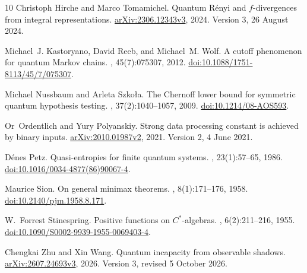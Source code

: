 \documentclass[11pt]{article}
\numberwithin{equation}{section}
\theoremstyle{definition}
\theoremstyle{remark}
\begin{document}
{\begin{thebibliography}{10}
Christoph Hirche and Marco Tomamichel.
\newblock Quantum {R\'enyi} and $f$-divergences from integral representations.
\newblock \href{https://arxiv.org/abs/2306.12343v3}{arXiv:2306.12343v3}, 2024.
\newblock Version 3, 26 August 2024.

Michael~J. Kastoryano, David Reeb, and Michael~M. Wolf.
\newblock A cutoff phenomenon for quantum {Markov} chains.
,
  45(7):075307, 2012.
\newblock
  \href{https://doi.org/10.1088/1751-8113/45/7/075307}{doi:10.1088/1751-8113/45/7/075307}.

Michael Nussbaum and Arleta Szko{\l}a.
\newblock The {Chernoff} lower bound for symmetric quantum hypothesis testing.
, 37(2):1040--1057, 2009.
\newblock \href{https://doi.org/10.1214/08-AOS593}{doi:10.1214/08-AOS593}.

Or~Ordentlich and Yury Polyanskiy.
\newblock Strong data processing constant is achieved by binary inputs.
\newblock \href{https://arxiv.org/abs/2010.01987v2}{arXiv:2010.01987v2}, 2021.
\newblock Version 2, 4 June 2021.

D{\'e}nes Petz.
\newblock Quasi-entropies for finite quantum systems.
, 23(1):57--65, 1986.
\newblock
  \href{https://doi.org/10.1016/0034-4877(86)90067-4}{doi:10.1016/0034-4877(86)90067-4}.

Maurice Sion.
\newblock On general minimax theorems.
, 8(1):171--176, 1958.
\newblock
  \href{https://doi.org/10.2140/pjm.1958.8.171}{doi:10.2140/pjm.1958.8.171}.

W.~Forrest Stinespring.
\newblock Positive functions on {$C^*$}-algebras.
,
  6(2):211--216, 1955.
\newblock
  \href{https://doi.org/10.1090/S0002-9939-1955-0069403-4}{doi:10.1090/S0002-9939-1955-0069403-4}.

Chengkai Zhu and Xin Wang.
\newblock Quantum incapacity from observable shadows.
\newblock \href{https://arxiv.org/abs/2607.24693v3}{arXiv:2607.24693v3}, 2026.
\newblock Version 3, revised 5 October 2026.

\end{thebibliography}

}
\end{document}

